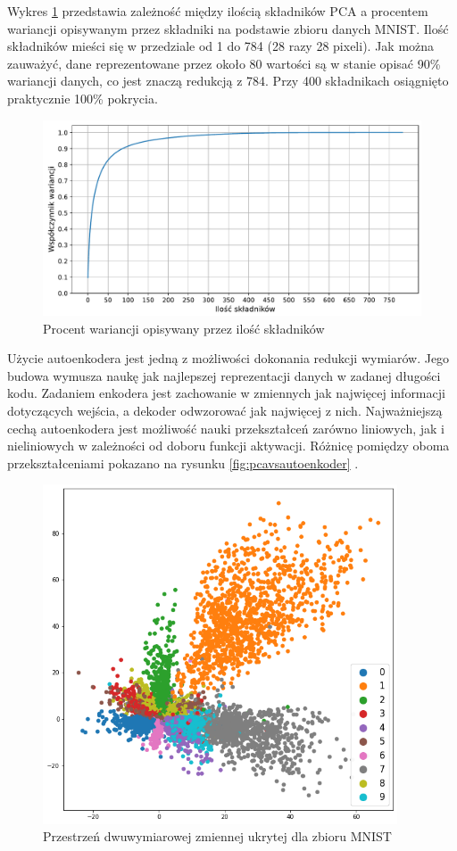 \documentclass[a4paper,12pt,oneside]{book} %
\begin{document}
Wykres \ref{fig:pcacumsum} przedstawia zależność między ilością składników PCA a procentem wariancji opisywanym przez składniki na podstawie zbioru danych MNIST. Ilość składników mieści się w przedziale od 1 do 784 (28 razy 28 pixeli). Jak można zauważyć, dane reprezentowane przez około 80 wartości są w stanie opisać 90\% wariancji danych, co jest znaczą redukcją z 784. Przy 400 składnikach osiągnięto praktycznie 100\% pokrycia. 
\begin{figure}[h!]
	\centering
	\includegraphics[width=\textwidth]{pcacumsum.pdf}
	\caption{Procent wariancji opisywany przez ilość składników}
	\label{fig:pcacumsum}
\end{figure}


Użycie autoenkodera jest jedną z możliwości dokonania redukcji wymiarów. Jego budowa wymusza naukę jak najlepszej reprezentacji danych w zadanej długości kodu. Zadaniem enkodera jest zachowanie w zmiennych jak najwięcej informacji dotyczących wejścia, a dekoder odwzorować jak najwięcej z nich. Najważniejszą cechą autoenkodera jest możliwość nauki przekształceń zarówno liniowych, jak i nieliniowych w zależności od doboru funkcji aktywacji. Różnicę pomiędzy oboma przekształceniami pokazano na rysunku \ref{fig:pcavsautoenkoder} \cite{nonlinearpca}.
\begin{figure}[h!]
	\centering
	\includegraphics[width=10.5cm]{pictures/aelatentspace.png}
	\caption{Przestrzeń dwuwymiarowej zmiennej ukrytej dla zbioru MNIST}
	\label{fig:latentspaceae}
\end{figure}
\end{document}
